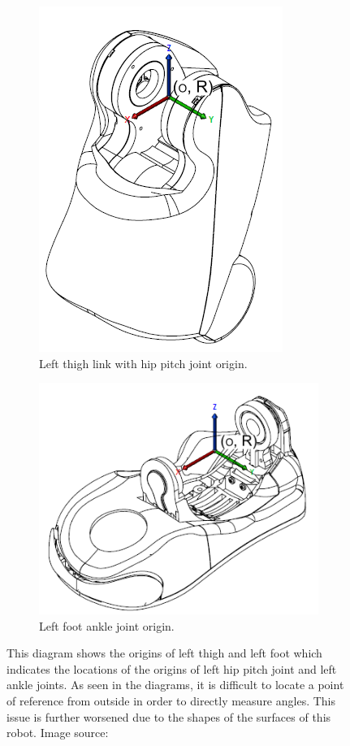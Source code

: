\documentclass[english, printversion, nomenclature, notitle]{tuvisionthesis} %
\begin{document}
\begin{figure}
	\begin{subfigure}{0.5\columnwidth}
	\centering
		\includegraphics[width=0.57\columnwidth]{figures/nao_link_origins.png}
		\caption{Left thigh link with hip pitch joint origin.}
	\end{subfigure}
	\begin{subfigure}{0.5\columnwidth}
		\includegraphics[width=\columnwidth]{figures/nao_left_foot.png}
		\caption{Left foot ankle joint origin.}
	\end{subfigure}
	\caption[Nao joint origins.]{This diagram shows the origins of left thigh and left foot which indicates the locations of the origins of left hip pitch joint and left ankle joints. As seen in the diagrams, it is difficult to locate a point of reference from outside in order to directly measure angles. This issue is further worsened due to the shapes of the surfaces of this robot. Image source: \cite{softbank_robotics_joint_nodate}}
	\label{fig:naolinkorigins}
\end{figure}
\end{document}
